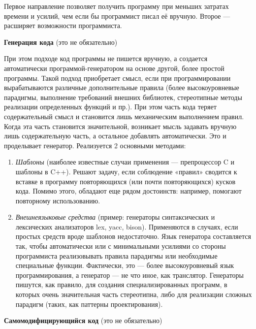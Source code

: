 \documentclass{article}
\begin{document}
Первое направление позволяет получить программу при меньших затратах времени и усилий, чем если бы программист писал её вручную. Второе — расширяет возможности программиста.

\textbf{Генерация кода} (это не обязательно)

При этом подходе код программы не пишется вручную, а создается автоматически программой-генератором на основе другой, более простой программы.
Такой подход приобретает смысл, если при программировании вырабатываются различные дополнительные правила (более высокоуровневые парадигмы, выполнение требований внешних библиотек, стереотипные методы реализации определенных функций и пр.). При этом часть кода теряет содержательный смысл и становится лишь механическим выполнением правил. Когда эта часть становится значительной, возникает мысль задавать вручную лишь содержательную часть, а остальное добавлять автоматически. Это и проделывает генератор. Реализуется 2 основными методами:

\begin{enumerate}
	\item  \emph{Шаблоны} (наиболее известные случаи применения — препроцессор C и шаблоны в C++). Решают задачу, если соблюдение «правил» сводится к вставке в программу повторяющихся (или почти повторяющихся) кусков кода. Помимо этого, обладают еще рядом достоинств: например, помогают повторному использованию.
	\item \emph{Внешнеязыковые средства} (пример: генераторы синтаксических и лексических анализаторов lex, yacc, bison). Применяются в случаях, если простых средств вроде шаблонов недостаточно. Язык генератора составляется так, чтобы автоматически или с минимальными усилиями со стороны программиста реализовывать правила парадигмы или необходимые специальные функции. Фактически, это — более высокоуровневый язык программирования, а генератор — не что иное, как транслятор.
	Генераторы пишутся, как правило, для создания специализированных программ, в которых очень значительная часть стереотипна, либо для реализации сложных парадигм (таких, как паттерны проектирования).
\end{enumerate}

\textbf{Самомодифицирующийся код} (это не обязательно)
\end{document}
